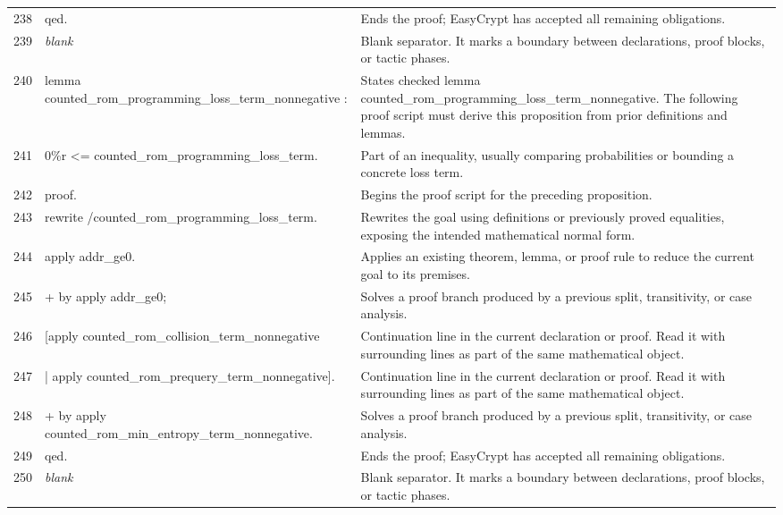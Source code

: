\documentclass[10pt]{article}
\begin{document}
\begin{longtable}{r L{0.53\textwidth} L{0.37\textwidth}}
238 & {\ttfamily\scriptsize qed.} & Ends the proof; EasyCrypt has accepted all remaining obligations. \\
239 & {\ttfamily\scriptsize \emph{blank}} & Blank separator.  It marks a boundary between declarations, proof blocks, or tactic phases. \\
240 & {\ttfamily\scriptsize lemma counted\_rom\_programming\_loss\_term\_nonnegative :} & States checked lemma counted\_rom\_programming\_loss\_term\_nonnegative.  The following proof script must derive this proposition from prior definitions and lemmas. \\
241 & {\ttfamily\scriptsize   0\%r <= counted\_rom\_programming\_loss\_term.} & Part of an inequality, usually comparing probabilities or bounding a concrete loss term. \\
242 & {\ttfamily\scriptsize proof.} & Begins the proof script for the preceding proposition. \\
243 & {\ttfamily\scriptsize rewrite /counted\_rom\_programming\_loss\_term.} & Rewrites the goal using definitions or previously proved equalities, exposing the intended mathematical normal form. \\
244 & {\ttfamily\scriptsize apply addr\_ge0.} & Applies an existing theorem, lemma, or proof rule to reduce the current goal to its premises. \\
245 & {\ttfamily\scriptsize + by apply addr\_ge0;} & Solves a proof branch produced by a previous split, transitivity, or case analysis. \\
246 & {\ttfamily\scriptsize      [apply counted\_rom\_collision\_term\_nonnegative} & Continuation line in the current declaration or proof.  Read it with surrounding lines as part of the same mathematical object. \\
247 & {\ttfamily\scriptsize      | apply counted\_rom\_prequery\_term\_nonnegative].} & Continuation line in the current declaration or proof.  Read it with surrounding lines as part of the same mathematical object. \\
248 & {\ttfamily\scriptsize + by apply counted\_rom\_min\_entropy\_term\_nonnegative.} & Solves a proof branch produced by a previous split, transitivity, or case analysis. \\
249 & {\ttfamily\scriptsize qed.} & Ends the proof; EasyCrypt has accepted all remaining obligations. \\
250 & {\ttfamily\scriptsize \emph{blank}} & Blank separator.  It marks a boundary between declarations, proof blocks, or tactic phases. \\

\end{longtable}
\end{document}
